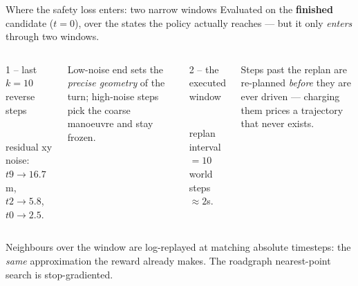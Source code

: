 \begin{frame}{Where the safety loss enters: two narrow windows}
  \small
  Evaluated on the \textbf{finished} candidate ($t{=}0$), over the states the
  policy actually reaches --- but it only \emph{enters} through two windows.
  \begin{columns}[T]
    \begin{block}{1 -- last $k{=}10$ reverse steps}
    \centering
    \\[3pt]
    {\scriptsize residual xy noise: $t9{\to}16.7$m, $t2{\to}5.8$, $t0{\to}2.5$.}
    \end{block}
    Low-noise end sets the \emph{precise geometry} of the turn; high-noise steps
    pick the coarse manoeuvre and stay frozen.

    \begin{block}{2 -- the executed window}
    \centering
    \\[3pt]
    {\scriptsize replan interval $=10$ world steps $\approx 2$s.}
    \end{block}
    Steps past the replan are re-planned \emph{before} they are ever driven ---
    charging them prices a trajectory that never exists.
  \end{columns}
  \vspace{1pt}
  \footnotesize Neighbours over the window are log-replayed at matching absolute
  timesteps: the \emph{same} approximation the reward already makes. The
  roadgraph nearest-point search is stop-gradiented.
\end{frame}


